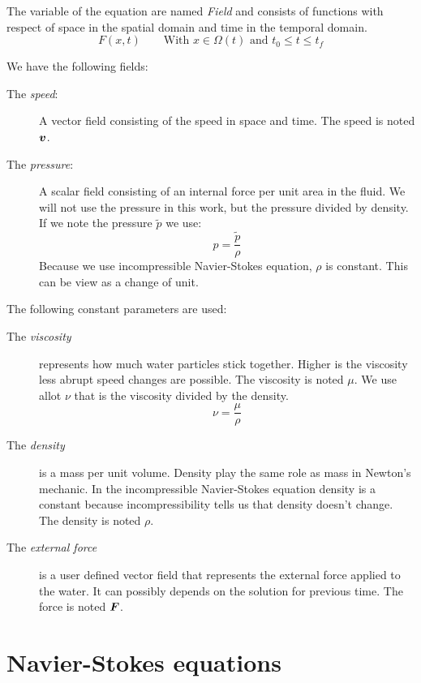 The variable of the equation are named \emph{Field} and consists of functions with respect of space in the spatial domain and time in the temporal domain.
\begin{equation}
 F(x,t)\qquad \text{With $x\in\Omega(t)$ and $t_0\leq t \leq t_f$}
\end{equation}

We have the following fields:
\begin{description}
\item[The \emph{speed}:] A vector field consisting of the speed in space and time.
The speed is noted ${\boldsymbol {v}}$.
\item[The \emph{pressure}:] A scalar field consisting of an internal force per unit area in the fluid.
We will not use the pressure in this work, but the pressure divided by density.
If we note the pressure $\tilde{p}$ we use:
\begin{equation}
 p=\frac{\tilde{p}}{\rho}
\end{equation}
Because we use incompressible Navier-Stokes equation, $\rho$ is constant. This can be view as a change of unit.
\end{description}

The following constant parameters are used:
\begin{description}
\item[The \emph{viscosity}] represents how much water particles stick together.
Higher is the viscosity less abrupt speed changes are possible.
The viscosity is noted $\mu$. We use allot $\nu$ that is the viscosity divided by the density.
\begin{equation}
 \nu=\frac{\mu}{\rho}
\end{equation}
\item[The \emph{density}] is a mass per unit volume.
Density play the same role as mass in Newton's mechanic.
In the incompressible Navier-Stokes equation density is a constant because incompressibility tells us that density doesn't change.
The density is noted $\rho$.
\item[The \emph{external force}] is a user defined vector field that represents the external force applied to the water.
It can possibly depends on the solution for previous time.
The force is noted ${\boldsymbol {F}}$.
\end{description}

\section{Navier-Stokes equations}

